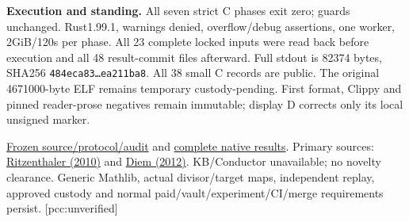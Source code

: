 \documentclass[10pt,a4paper]{article}
\begin{document}
\textbf{Execution and standing.}
All seven strict C phases exit zero; guards unchanged. Rust1.99.1,
warnings denied, overflow/debug assertions, one worker, 2GiB/120s per phase.
All 23 complete locked inputs were read back before execution and all 48
result-commit files afterward. Full stdout is 82374 bytes, SHA256
\texttt{484eca83\ldots ea211ba8}. All 38 small C records are public.
The original 4671000-byte ELF remains temporary custody-pending.
First format, Clippy and pinned reader-prose negatives remain immutable;
display D corrects only its local unsigned marker.

\href{https://github.com/isogeny-labs/crypto/tree/323ece1140a7346630a2f172acc9303e723f3bd0/research/chained_cm19_hermitian_20261123}{Frozen source/protocol/audit}
and
\href{https://github.com/isogeny-labs/crypto/tree/b2ce1276f1b5e967b0bccdb12f1a67e5ee940691/research/chained_cm19_hermitian_20261123}{complete native results}.
Primary sources:
\href{https://doi.org/10.1112/S1461157009000576}{Ritzenthaler (2010)}
and \href{https://doi.org/10.5802/jtnb.815}{Diem (2012)}.
KB/Conductor unavailable; no novelty clearance. Generic Mathlib, actual
divisor/target maps, independent replay, approved custody and normal
paid/vault/experiment/CI/merge requirements persist. [pcc:unverified]
\end{document}
